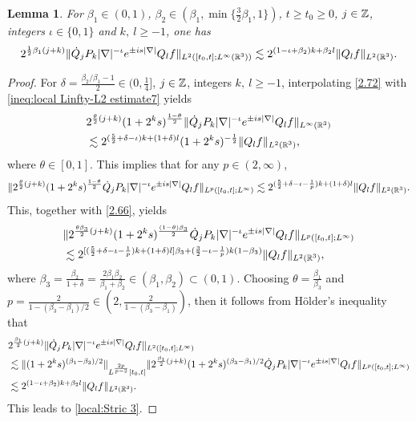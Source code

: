 \documentclass[11pt,twoside]{article}
\def\Z{\mathop{\mathbb Z\kern 0pt}\nolimits}
\def\R{\mathop{\mathbb R\kern 0pt}\nolimits}
\def\f{\frac}
\def\ls{\lesssim}
\newcommand{\q}{\dot{Q}}
\theoremstyle{plain}
\newtheorem{lemma}[theorem]{Lemma}
\theoremstyle{definition}
\numberwithin{equation}{section}
\begin{document}
	\begin{lemma}\label{lem:Localized Strichartz estimate 2}
		For $\beta_1\in(0,1)$, $\beta_2\in(\beta_1,\min\{\f32\beta_1,1\})$, $t\ge t_0\ge 0$, $j\in\Z$, integers $\iota\in\{0,1\}$ and $k,\ l\ge -1$, one has
		\begin{equation}\label{local:Stric 3}
			2^{\f12 \beta_1 (j+k)}\|\q_jP_{k}|\nabla|^{-\iota}e^{\pm is|\nabla|}Q_lf\|_{L^2([t_0,t];L^\infty(\R^3))}
			\ls2^{(1-\iota+\beta_2) k+\beta_2l}\|Q_lf\|_{L^2(\R^3)}.
		\end{equation}
	\end{lemma}
	\begin{proof}
		For $\delta=\f{\beta_2/\beta_1-1}{2}\in(0,\f14]$,  $j\in\Z$, integers $k,\ l\ge -1$, interpolating \eqref{2.72}
with \eqref{ineq:local Linfty-L2 estimate7} yields
		\begin{equation}\label{2.84}
         \begin{split}
		&2^{\f{\theta}{2}(j+k)}(1+2^ks)^{\f{1-\theta}{2}}\|\q_jP_{k}|\nabla|^{-\iota}e^{\pm is|\nabla|}Q_lf\|_{L^\infty(\R^3)}\\
		&\ls 2^{(\f52+\delta-\iota)k+(1+\delta)l}(1+2^ks)^{-\f12}\|Q_l f\|_{L^2(\R^3)},
        \end{split}
		\end{equation}
		where $\theta\in[0,1]$. This implies that for any $p\in(2,\infty)$,
		\begin{equation*}
			\|2^{\f{\theta}{2}(j+k)}(1+2^ks)^{\f{1-\theta}{2}}\q_jP_{k}|\nabla|^{-\iota}e^{\pm is|\nabla|}Q_lf\|_{L^p([t_0,t];L^\infty)}
			\ls	
			2^{(\f52+\delta-\iota-\f1p) k+(1+\delta)l}\|Q_lf\|_{L^2(\R^3)}.
		\end{equation*}
This, together with \eqref{2.66}, yields
		\begin{equation*}
			\begin{split}
				&\|2^{\f{\theta\beta_3}{2}(j+k)}(1+2^ks)^{\f{(1-\theta)\beta_3}{2}}\q_jP_{k}|\nabla|^{-\iota}e^{\pm is|\nabla|}Q_lf\|_{L^p([t_0,t];L^\infty)}\\
				&\ls 2^{[(\f52+\delta-\iota-\f1p) k+(1+\delta)l]\beta_3 +(\f32-\iota-\f1p)k(1-\beta_3)}\|Q_lf\|_{L^2(\R^3)},
			\end{split}
		\end{equation*}
		where $\beta_3 = \f{\beta_2}{1+\delta} = \f{2\beta_1\beta_2}{\beta_1+\beta_2}\in(\beta_1,\beta_2)\subset(0,1)$. Choosing $\theta = \f{\beta_1}{\beta_3}$ and $p=\frac{2}{1-(\beta_3-\beta_1)/2}\in(2,\frac{2}{1-(\beta_3-\beta_1)})$,
		then it follows from H\"{o}lder's inequality that
		\begin{equation*}
			\begin{split}
				&2^{\f{\beta_1}{2}(j+k)}\|\q_jP_{k}|\nabla|^{-\iota}e^{\pm is|\nabla|}Q_lf\|_{L^2([t_0,t];L^\infty)}\\
				&\ls
				\|(1+2^ks)^{(\beta_1-\beta_3)/2}\|_{L^\frac{2p}{p-2}[t_0,t]}
				\|2^{\f{\beta_1}{2}(j+k)}(1+2^ks)^{(\beta_3-\beta_1)/2}\q_jP_{k}|\nabla|^{-\iota}e^{\pm is|\nabla|}Q_lf\|_{L^p([t_0,t];L^\infty)}\\
				&\ls2^{(1-\iota+\beta_2) k+\beta_2l}\|Q_lf\|_{L^2(\R^3)}.
			\end{split}
		\end{equation*}
		This leads to \eqref{local:Stric 3}.
	\end{proof}
\end{document}
